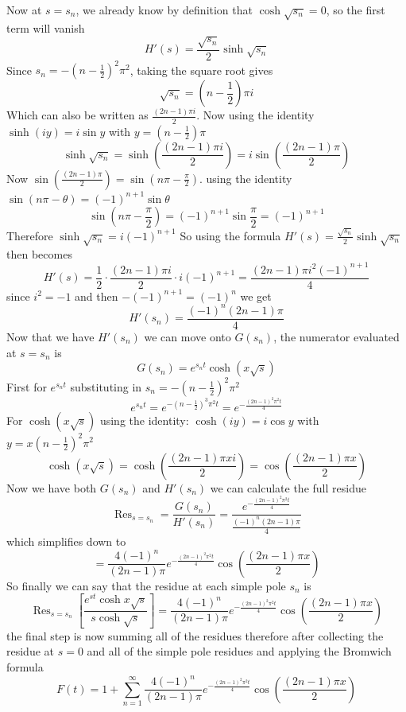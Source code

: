 Now at $s=s_n$, we already know by definition that $\cosh\sqrt{s_n}=0$, so the first term will vanish $$H'(s)=\frac{\sqrt{s_n}}{2}\sinh\sqrt{s_n}$$ Since $s_n=-\left(n-\frac{1}{2}\right)^2\pi^2$, taking the square root gives $$\sqrt{s_n}=\left(n-\frac{1}{2}\right)\pi i$$ Which can also be written as $\frac{(2n-1)\pi i}{2}$. Now using the identity $\sinh(iy)=i\sin y$ with $y=(n-\frac{1}{2})\pi$ $$\sinh\sqrt{s_n}=\sinh\left(\frac{(2n-1)\pi i}{2}\right)=i\sin\left(\frac{(2n-1)\pi}{2}\right)$$ Now $\sin\left(\frac{(2n-1)\pi}{2}\right)=\sin(n\pi-\frac{\pi}{2})$. using the identity $\sin(n\pi-\theta)=(-1)^{n+1}\sin\theta$ $$\sin\left(n\pi-\frac{\pi}{2}\right)=(-1)^{n+1}\sin\frac{\pi}{2}=(-1)^{n+1}$$ Therefore $\sinh\sqrt{s_n}=i(-1)^{n+1}$ So using the formula $H'(s)=\frac{\sqrt{s_n}}{2}\sinh\sqrt{s_n}$ then becomes $$H'(s)=\frac{1}{2}\cdot\frac{(2n-1)\pi i}{2}\cdot i(-1)^{n+1}=\frac{(2n-1)\pi i^2(-1)^{n+1}}{4}$$ since $i^2=-1$ and then $-(-1)^{n+1}=(-1)^n$ we get $$H'(s_n)=\frac{(-1)^n(2n-1)\pi}{4}$$ Now that we have $H'(s_n)$ we can move onto $G(s_n)$, the numerator evaluated at $s=s_n$ is $$G(s_n)=e^{s_n t}\cosh(x\sqrt{s})$$ First for $e^{s_n t}$ substituting in $s_n=-(n-\frac{1}{2})^2\pi^2$ $$e^{s_nt}=e^{-(n-\frac{1}{2})^3\pi^2t}=e^{-\frac{(2n-1)^2 \pi^2 t}{4}}$$ For $\cosh(x\sqrt{s})$ using the identity: $\cosh(iy)=i\cos y$ with $y=x(n-\frac{1}{2})^2\pi^2$ $$\cosh(x\sqrt{s})=\cosh\left(\frac{(2n-1)\pi x i}{2}\right)=\cos\left(\frac{(2n-1)\pi x}{2}\right)$$ Now we have both $G(s_n)$ and $H'(s_n)$ we can calculate the full residue $$\operatorname{Res}_{s=s_n}=\frac{G(s_n)}{H'(s_n)}=\frac{e^{-\frac{(2n-1)^2 \pi^2 t}{4}}}{\frac{(-1)^n(2n-1)\pi}{4}}$$ which simplifies down to $$=\frac{4(-1)^n}{(2n-1)\pi}e^{-\frac{(2n-1)^2\pi^2t}{4}}\cos\left(\frac{(2n-1)\pi x}{2}\right)$$ So finally we can say that the residue at each simple pole $s_n$ is $$\operatorname{Res}_{s=s_n}\left[\frac{e^{st}\cosh x\sqrt{s}}{s\cosh\sqrt{s}}\right]=\frac{4(-1)^n}{(2n-1)\pi}e^{-\frac{(2n-1)^2\pi^2t}{4}}\cos\left(\frac{(2n-1)\pi x}{2}\right)$$ the final step is now summing all of the residues therefore after collecting the residue at $s=0$ and all of the simple pole residues and applying the Bromwich formula $$F(t)=1+\sum^{\infty}_{n=1}\frac{4(-1)^n}{(2n-1)\pi}e^{-\frac{(2n-1)^2\pi^2t}{4}}\cos\left(\frac{(2n-1)\pi x}{2}\right)$$
\newpage





